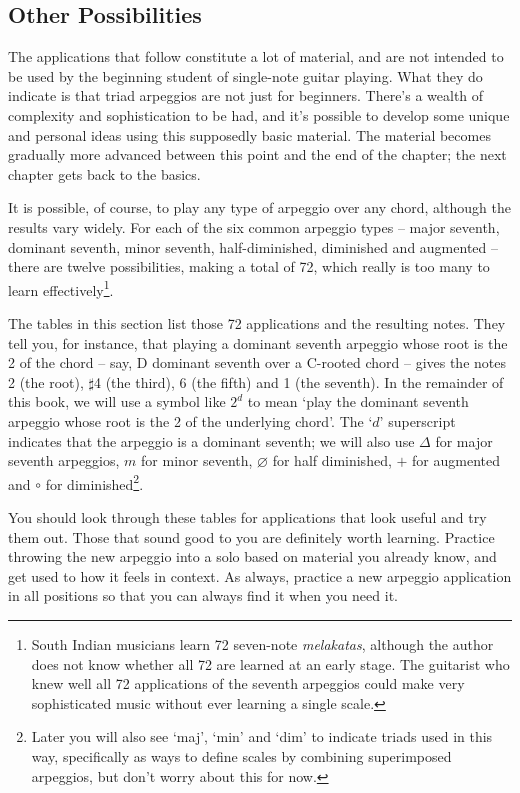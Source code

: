 \documentclass[english]{./gbook}
\begin{document}
\begin{large}
\section{Other Possibilities}

The applications that follow constitute a lot of material, and are not intended to be used by the beginning student of single-note guitar playing. What they do indicate is that triad arpeggios are not just for beginners. There's a wealth of complexity and sophistication to be had, and it's possible to develop some unique and personal ideas using this supposedly basic material. The material becomes gradually more advanced between this point and the end of the chapter; the next chapter gets back to the basics.

It is possible, of course, to play any type of arpeggio over any chord, although the results vary widely. For each of the six common arpeggio types -- major seventh, dominant seventh, minor seventh, half-diminished, diminished and augmented -- there are twelve possibilities, making a total of 72, which really is too many to learn effectively\footnote{South Indian musicians learn 72 seven-note \emph{melakatas}, although the author does not know whether all 72 are learned at an early stage. The guitarist who knew well all 72 applications of the seventh arpeggios could make very sophisticated music without ever learning a single scale.}.

The tables in this section list those 72 applications and the resulting notes. They tell you, for instance, that playing a dominant seventh arpeggio whose root is the 2 of the chord -- say, D dominant seventh over a C-rooted chord -- gives the notes 2 (the root), $\sharp$4 (the third), 6 (the fifth) and 1 (the seventh). In the remainder of this book, we will use a symbol like $2^{d}$ to mean `play the dominant seventh arpeggio whose root is the 2 of the underlying chord'. The `$d$' superscript indicates that the arpeggio is a dominant seventh; we will also use $\Delta$ for major seventh arpeggios, $m$ for minor seventh, $\varnothing$ for half diminished, $+$ for augmented and $\circ$ for diminished\footnote{Later you will also see `maj', `min' and `dim' to indicate triads used in this way, specifically as ways to define scales by combining superimposed arpeggios, but don't worry about this for now.}.

You should look through these tables for applications that look useful and try them out. Those that sound good to you are definitely worth learning. Practice throwing the new arpeggio into a solo based on material you already know, and get used to how it feels in context. As always, practice a new arpeggio application in all positions so that you can always find it when you need it.


\end{large}
\end{document}
